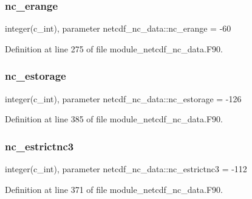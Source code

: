 \mbox{\label{namespacenetcdf__nc__data_aac3d60689bcec8bf0eb3450d445eab46}} 
\subsubsection{\texorpdfstring{nc\+\_\+erange}{nc\_erange}}
{\footnotesize\ttfamily integer(c\+\_\+int), parameter netcdf\+\_\+nc\+\_\+data\+::nc\+\_\+erange = -\/60}



Definition at line 275 of file module\+\_\+netcdf\+\_\+nc\+\_\+data.\+F90.

\mbox{\label{namespacenetcdf__nc__data_aa9f3cb09d10ef954bff75ddcd1cbba3a}} 
\subsubsection{\texorpdfstring{nc\+\_\+estorage}{nc\_estorage}}
{\footnotesize\ttfamily integer(c\+\_\+int), parameter netcdf\+\_\+nc\+\_\+data\+::nc\+\_\+estorage = -\/126}



Definition at line 385 of file module\+\_\+netcdf\+\_\+nc\+\_\+data.\+F90.

\mbox{\label{namespacenetcdf__nc__data_a31d4e1a356ae4e6fc421a82870a3db6e}} 
\subsubsection{\texorpdfstring{nc\+\_\+estrictnc3}{nc\_estrictnc3}}
{\footnotesize\ttfamily integer(c\+\_\+int), parameter netcdf\+\_\+nc\+\_\+data\+::nc\+\_\+estrictnc3 = -\/112}



Definition at line 371 of file module\+\_\+netcdf\+\_\+nc\+\_\+data.\+F90.

